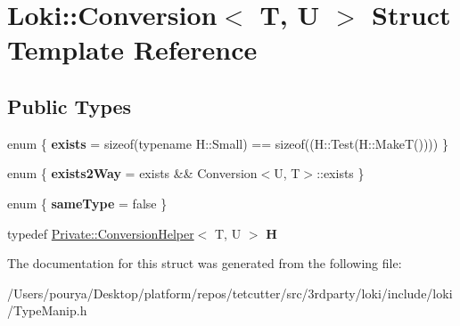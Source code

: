 \hypertarget{structLoki_1_1Conversion}{}\section{Loki\+:\+:Conversion$<$ T, U $>$ Struct Template Reference}
\label{structLoki_1_1Conversion}
\subsection*{Public Types}
\begin{DoxyCompactItemize}
\item 
\hypertarget{structLoki_1_1Conversion_ac2be53c6bb2f3e57c898b489946762ca}{}enum \{ {\bfseries exists} = sizeof(typename H\+:\+:Small) == sizeof((H\+:\+:Test(H\+:\+:Make\+T())))
 \}\label{structLoki_1_1Conversion_ac2be53c6bb2f3e57c898b489946762ca}

\item 
\hypertarget{structLoki_1_1Conversion_a4874e979c584718d26c74956dd520cde}{}enum \{ {\bfseries exists2\+Way} = exists \&\& Conversion$<$U, T$>$\+:\+:exists
 \}\label{structLoki_1_1Conversion_a4874e979c584718d26c74956dd520cde}

\item 
\hypertarget{structLoki_1_1Conversion_a161cf1c18e780d7319aeaf96eba14162}{}enum \{ {\bfseries same\+Type} = false
 \}\label{structLoki_1_1Conversion_a161cf1c18e780d7319aeaf96eba14162}

\item 
\hypertarget{structLoki_1_1Conversion_af6a74d9111b39ad502c1c300e57c7d7c}{}typedef \hyperlink{structLoki_1_1Private_1_1ConversionHelper}{Private\+::\+Conversion\+Helper}$<$ T, U $>$ {\bfseries H}\label{structLoki_1_1Conversion_af6a74d9111b39ad502c1c300e57c7d7c}

\end{DoxyCompactItemize}


The documentation for this struct was generated from the following file\+:\begin{DoxyCompactItemize}
\item 
/\+Users/pourya/\+Desktop/platform/repos/tetcutter/src/3rdparty/loki/include/loki/Type\+Manip.\+h\end{DoxyCompactItemize}
